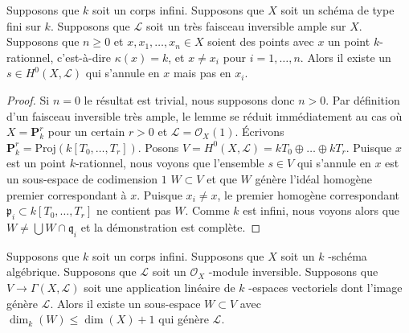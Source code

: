 \begin{lemma}
\label{lemma-very-ample-vanish-at-point}
Supposons que $k$ soit un corps infini. Supposons que $X$ soit
un schéma de type fini sur $k$. Supposons que $\mathcal{L}$
soit un très faisceau inversible ample sur $X$. Supposons que
$n \geq 0$ et $x, x_1, \ldots, x_n \in X$ soient des points
avec $x$ un point $k$-rationnel, c'est-à-dire $\kappa(x) = k$,
et $x \not = x_i$ pour $i = 1, \ldots, n$. Alors il existe un $s
\in H^0(X, \mathcal{L})$ qui s'annule en $x$ mais pas en $x_i$.
\end{lemma}

\begin{proof}
Si $n = 0$ le résultat est trivial, nous supposons donc $n >
0$. Par définition d'un faisceau inversible très ample, le
lemme se réduit immédiatement au cas où $X = \mathbf{P}^r_k$
pour un certain $r > 0$ et $\mathcal{L} = \mathcal{O}_X(1)$.
Écrivons $\mathbf{P}^r_k = \text{Proj}(k[T_0, \ldots, T_r])$.
Posons $V = H^0(X, \mathcal{L}) = kT_0 \oplus \ldots \oplus
kT_r$. Puisque $x$ est un point $k$-rationnel, nous voyons que
l'ensemble $s \in V$ qui s'annule en $x$ est un sous-espace de
codimension $1$ $W \subset V$ et que $W$ génère l'idéal homogène
premier correspondant à $x$. Puisque $x_i \not = x$, le premier
homogène correspondant $\mathfrak p_i \subset k[T_0, \ldots, T_r]$
ne contient pas $W$. Comme $k$ est infini, nous voyons alors que $W
\not = \bigcup W \cap \mathfrak q_i$ et la démonstration est complète.
\end{proof}

\begin{lemma}
\label{lemma-generated-by-dim-plus-1-sections}
Supposons que $k$ soit un corps infini. Supposons que $X$ soit un $k$ -schéma
algébrique. Supposons que $\mathcal{L}$ soit un $\mathcal{O}_X$ -module
inversible. Supposons que $V \to \Gamma(X, \mathcal{L})$ soit une application
linéaire de $k$ -espaces vectoriels dont l'image génère $\mathcal{L}$. Alors il existe
un sous-espace $W \subset V$ avec $\dim_k(W) \leq \dim(X) + 1$ qui génère $\mathcal{L}$.
\end{lemma}

